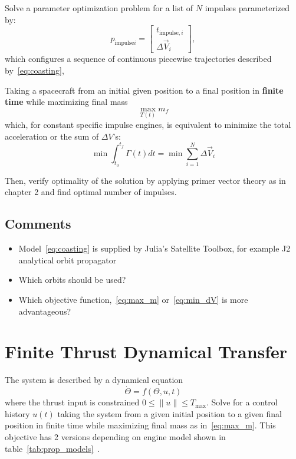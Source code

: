 Solve a parameter optimization problem for a list of \(N\) impulses parameterized by:
\begin{equation} 
    p_{\text{impulse}i} = \begin{bmatrix}
        t_{\text{impulse},i} \\
        \Delta \vec{V}_i
    \end{bmatrix},
\end{equation}
which configures a sequence of continuous piecewise trajectories described by~\eqref{eq:coasting},

Taking a spacecraft from an initial given position to a final position in \textbf{finite time} while maximizing final mass
\begin{equation} \label{eq:max_m}
    \max_{T(t)} m_f 
\end{equation}
which, for constant specific impulse engines, is equivalent to minimize the total acceleration or the sum of \(\Delta V\)'s:
\begin{equation} \label{eq:min_dV}
    \min \int_{t_0}^{t_f} \Gamma(t) dt = \min \sum_{i=1}^N \Delta \vec{V}_i
\end{equation}

Then, verify optimality of the solution by applying primer vector theory as in \cite{Conway_2010} chapter 2 and find optimal number of impulses.

\subsection{Comments}

\begin{itemize}
    \item Model~\eqref{eq:coasting} is supplied by Julia's Satellite Toolbox, for example J2 analytical orbit propagator
    \item Which orbits should be used?
    \item Which objective function,~\eqref{eq:max_m} or~\eqref{eq:min_dV} is more advantageous?
\end{itemize}

\section{Finite Thrust Dynamical Transfer}

The system is described by a dynamical equation
\begin{equation}
    \dot \Theta = f(\Theta, u, t)
\end{equation}
where the thrust input is constrained \(0 \leq \lVert u \rVert \leq T_{\max}\). Solve for a control history \(u(t)\) taking the system from a given initial position to a given final position in finite time while maximizing final mass as in~\eqref{eq:max_m}. This objective has 2 versions depending on engine model shown in table~\ref{tab:prop_models}~\cite{Conway_2010}.

